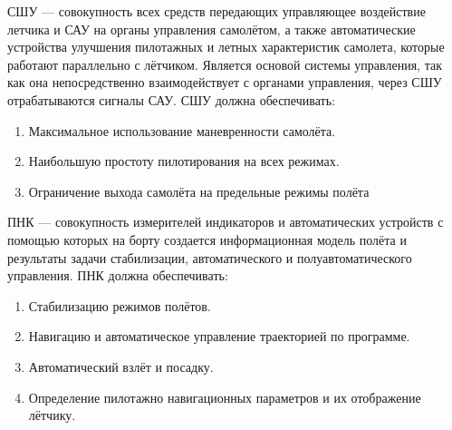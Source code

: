 \documentclass{article}
\begin{document}
\begin{figure}[ht]
\end{figure}
СШУ --- совокупность всех средств передающих управляющее воздействие летчика и САУ на органы управления самолётом, а также автоматические устройства улучшения пилотажных и летных характеристик самолета, которые работают параллельно с лётчиком. Является основой системы управления, так как она непосредственно взаимодействует с органами управления, через СШУ отрабатываются сигналы САУ. СШУ должна обеспечивать:
\begin{enumerate}
	\item Максимальное использование маневренности самолёта.
	\item Наибольшую простоту пилотирования на всех режимах.
	\item Ограничение выхода самолёта на предельные режимы полёта
\end{enumerate}
ПНК --- совокупность измерителей индикаторов и автоматических устройств с помощью которых на борту создается информационная модель полёта и результаты задачи стабилизации, автоматического и полуавтоматического управления. ПНК должна обеспечивать: 
\begin{enumerate}
	\item Стабилизацию режимов полётов.
	\item Навигацию и автоматическое управление траекторией по программе.
	\item Автоматический взлёт и посадку.
	\item Определение пилотажно навигационных параметров и их отображение лётчику.
\end{enumerate}
\end{document}
